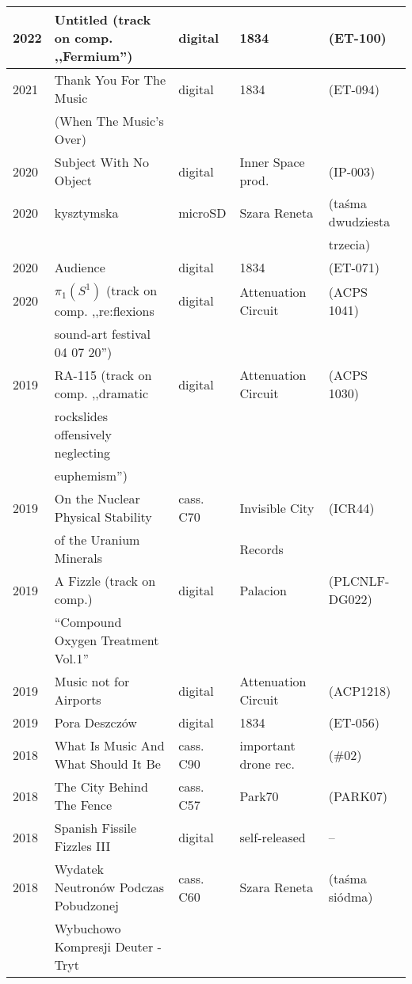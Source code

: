 \documentclass[a4paper]{article}
\begin{document}
\begin{tabularx}{\textwidth}{l l l l l}
\hline
2022 & Untitled (track on comp. ,,Fermium'') & digital & 1834 & (ET-100)\\
\hline
2021 & Thank You For The Music & digital & 1834 & (ET-094)\\
     & (When The Music's Over) & & & \\
\hline
2020 & Subject With No Object & digital & Inner Space prod. & (IP-003) \\
\hline
2020 & kysztymska & microSD & Szara Reneta & (taśma dwudziesta\\
     &            &         &              & trzecia)\\
\hline
2020 & Audience & digital & 1834 & (ET-071)\\
\hline
2020 &  $\pi_1(S^1)$ (track on comp. ,,re:flexions & digital & Attenuation Circuit & (ACPS 1041)\\
     & sound-art festival 04 07 20'') &  & & \\
\hline
2019 & RA-115 (track on comp. ,,dramatic           & digital & Attenuation Circuit & (ACPS 1030)\\
     & rockslides offensively neglecting & & &\\
     & euphemism'')          & & &\\
\hline
2019 & On the Nuclear Physical Stability & cass. C70 & Invisible City & (ICR44)\\
     & of the Uranium Minerals           &           & Records & \\
\hline
2019 & A Fizzle (track on comp.)           & digital & Palacion & (PLCNLF-DG022)\\
     & ``Compound Oxygen Treatment Vol.1'' &         &          & \\
\hline
2019 & Music not for Airports & digital & Attenuation Circuit & (ACP1218)\\
\hline
2019 & Pora Deszczów & digital & 1834 & (ET-056)\\
\hline
2018 & What Is Music And What Should It Be & cass. C90 & important drone rec. & (\#02)\\
\hline
2018 & The City Behind The Fence & cass. C57 & Park70 & (PARK07)\\
\hline
2018 & Spanish Fissile Fizzles III & digital & self-released & -- \\
\hline
2018 & Wydatek Neutronów Podczas Pobudzonej & cass. C60 & Szara Reneta & (taśma siódma)\\
     & Wybuchowo Kompresji Deuter - Tryt & & & \\

\end{tabularx}
\end{document}
